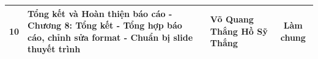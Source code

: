 \begin{center}
\begin{longtable}{|c|p{8.5cm}|p{3cm}|c|}
10 & \textbf{Tổng kết và Hoàn thiện báo cáo} \newline
- Chương 8: Tổng kết \newline
- Tổng hợp báo cáo, chỉnh sửa format \newline
- Chuẩn bị slide thuyết trình
& Võ Quang Thắng \newline Hồ Sỹ Thắng & Làm chung \\
\hline

\end{longtable}
\end{center}
